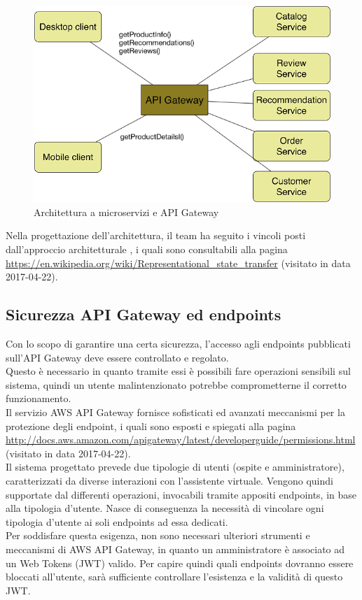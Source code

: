 \begin{figure}[h]
	\centering
	\includegraphics[width=\textwidth,height=\textheight,keepaspectratio,scale=0.1]{images/apigateway1.png}
	\caption{Architettura a microservizi e API Gateway}\label{fig:apig1}
\end{figure}
\newpage
Nella progettazione dell'architettura, il team ha seguito i vincoli posti dall'approccio architetturale , i quali sono consultabili alla pagina \url{https://en.wikipedia.org/wiki/Representational_state_transfer} (visitato in data 2017-04-22).
\subsection{Sicurezza API Gateway ed endpoints}
Con lo scopo di garantire una certa sicurezza, l'accesso agli endpoints pubblicati sull'API Gateway deve essere controllato e regolato. \\Questo è necessario in quanto tramite essi è possibili fare operazioni sensibili sul sistema, quindi un utente malintenzionato potrebbe comprometterne il corretto funzionamento.\\
Il servizio AWS API Gateway fornisce sofisticati ed avanzati meccanismi per la protezione degli endpoint, i quali sono esposti e spiegati alla pagina \url{http://docs.aws.amazon.com/apigateway/latest/developerguide/permissions.html} (visitato in data 2017-04-22). \\

Il sistema progettato prevede due tipologie di utenti (ospite e amministratore), caratterizzati da diverse interazioni con l'assistente virtuale. Vengono quindi supportate dal  differenti operazioni, invocabili tramite appositi endpoints, in base alla tipologia d'utente. Nasce di conseguenza la necessità di vincolare ogni tipologia d'utente ai soli endpoints ad essa dedicati. \\
Per soddisfare questa esigenza, non sono necessari ulteriori strumenti e meccanismi di AWS API Gateway, in quanto un amministratore è associato ad un  Web Tokens (JWT) valido. Per capire quindi quali endpoints dovranno essere bloccati all'utente, sarà sufficiente controllare l'esistenza e la validità di questo JWT.
